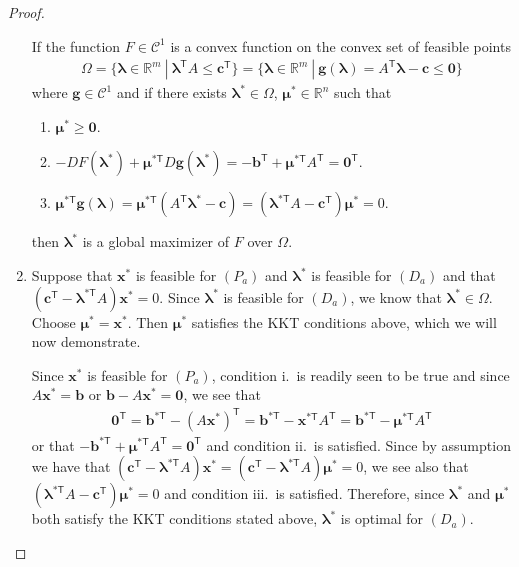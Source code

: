 \documentclass[12pt]{article}
\theoremstyle{definition}
\newcommand{\vc}[1]{\boldsymbol{#1}}
\newcommand{\tran}{\mathsf{T}}
\begin{document}
\begin{proof}
\begin{enumerate}
      If the function $F \in \mathcal{C}^1$ is a convex function on the convex set of feasible points
      \begin{align*}
        \Omega = \{\vc{\lambda}\in \mathbb{R}^m\ |\ \vc{\lambda}^\tran A \leq \vc{c}^\tran \} = \{\vc{\lambda} \in \mathbb{R}^m \ | \ \vc{g}(\vc{\lambda}) = A^\tran \vc{\lambda} - \vc{c} \leq \vc{0}\}
      \end{align*}
      where $\vc{g} \in \mathcal{C}^1$ and
      if there exists $\vc{\lambda}^* \in \Omega$, $\vc{\mu}^* \in \mathbb{R}^n$ such that
      \begin{enumerate}[label = \roman*]
        \item $\vc{\mu}^* \geq \vc{0}$.
        \item $-D F(\vc{\lambda}^*) + \vc{\mu}^{*\tran}D \vc{g}(\vc{\lambda}^*) = -\vc{b}^\tran + \vc{\mu}^{*\tran}A^\tran = \vc{0}^\tran$.
        \item $\vc{\mu}^{*\tran}\vc{g}(\vc{\lambda}) = \vc{\mu}^{*\tran} (A^\tran \vc{\lambda}^* - \vc{c})= (\vc{\lambda}^{*\tran} A - \vc{c}^\tran)\vc{\mu}^{*}  = 0$.
      \end{enumerate}
      then $\vc{\lambda}^*$ is a global maximizer of $F$ over $\Omega$.
    \item Suppose that $\vc{x}^*$ is feasible for $(P_a)$ and $\vc{\lambda}^*$
      is feasible for $(D_a)$ and that $(\vc{c}^\tran - \vc{\lambda}^{*\tran}A)\vc{x}^* = 0$. Since $\vc{\lambda}^*$ is feasible for $(D_a)$, we know that $\vc{\lambda}^* \in \Omega$.
      Choose $\vc{\mu}^* = \vc{x}^*$. Then $\vc{\mu}^*$ satisfies the KKT conditions above, which we will now demonstrate.

      Since $\vc{x}^*$ is feasible for $(P_a)$, condition i.\ is readily seen to be true and since $A\vc{x}^* = \vc{b}$ or $\vc{b} - A\vc{x}^* = \vc{0}$, we see that
      \begin{align*}
        \vc{0}^\tran = \vc{b}^{*\tran} - (A\vc{x}^*)^\tran = \vc{b}^{*\tran} - \vc{x}^{*\tran}A^\tran = \vc{b}^{*\tran} - \vc{\mu}^{*\tran}A^\tran
      \end{align*}
      or that $-\vc{b}^{*\tran} + \vc{\mu}^{*\tran}A^\tran = \vc{0}^\tran$ and condition ii.\ is satisfied.
      Since by assumption we have that $(\vc{c}^\tran - \vc{\lambda}^{*\tran}A)\vc{x}^* = (\vc{c}^\tran - \vc{\lambda}^{*\tran}A)\vc{\mu}^* =0$, we see
      also that $(\vc{\lambda}^{*\tran}A - \vc{c}^\tran)\vc{\mu}^* = 0$ and condition iii.\ is satisfied.
      Therefore, since $\vc{\lambda}^*$ and $\vc{\mu}^*$ both satisfy the KKT conditions stated above, $\vc{\lambda}^*$ is optimal for $(D_a)$.
  \end{enumerate}
\end{proof}
\end{document}
